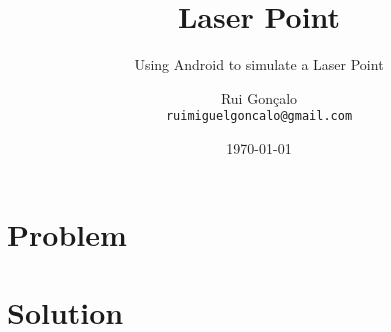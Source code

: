 \documentclass{llncs}
\begin{document}
\pagestyle{myheadings}

\title{Laser Point}
\subtitle{Using Android to simulate a Laser Point}
\author{Rui Gonçalo
        \\{\scriptsize \texttt{ruimiguelgoncalo@gmail.com}}
       }
\date{\today}
\maketitle


\begin{abstract}

\end{abstract}

\section{Problem}


\section{Solution}
\end{document}
